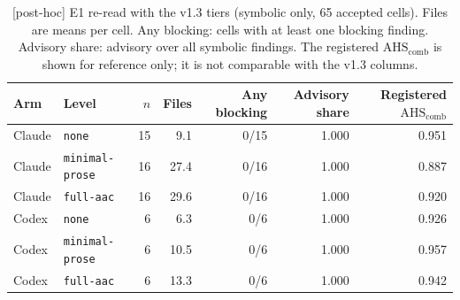 \documentclass[10pt,a4paper]{article}
\newcommand{\ph}{\textsf{\scriptsize[post-hoc]}}    %
\newcommand{\lev}[1]{\texttt{\small #1}}
\newcommand{\AHSc}{\mathrm{AHS}_{\mathrm{comb}}}
\begin{document}
\begin{table}[t]
\centering\small
\caption{\ph{} E1 re-read with the v1.3 tiers (symbolic only, 65 accepted cells). Files are means per cell.
Any blocking: cells with at least one blocking finding. Advisory share: advisory over all symbolic findings.
The registered $\AHSc$ is shown for reference only; it is not comparable with the v1.3 columns.}
\label{tab:floor}
\begin{tabular}{llrrrrr}
\toprule
Arm & Level & $n$ & Files & Any blocking & Advisory share & Registered $\AHSc$ \\
\midrule
Claude & \lev{none}          & 15 &  9.1 & 0/15 & 1.000 & 0.951 \\
Claude & \lev{minimal-prose} & 16 & 27.4 & 0/16 & 1.000 & 0.887 \\
Claude & \lev{full-aac}      & 16 & 29.6 & 0/16 & 1.000 & 0.920 \\
Codex  & \lev{none}          &  6 &  6.3 & 0/6  & 1.000 & 0.926 \\
Codex  & \lev{minimal-prose} &  6 & 10.5 & 0/6  & 1.000 & 0.957 \\
Codex  & \lev{full-aac}      &  6 & 13.3 & 0/6  & 1.000 & 0.942 \\
\bottomrule
\end{tabular}
\end{table}
\end{document}
